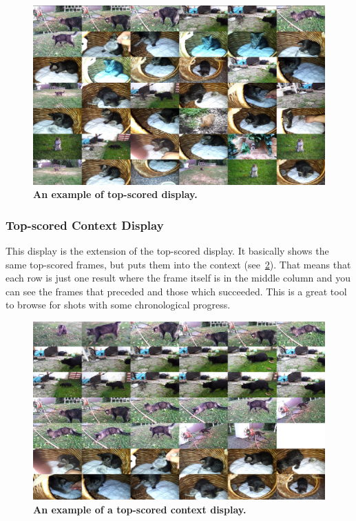 \begin{figure}[h]
	\centering
	\includegraphics[width=1.0\textwidth]{img/top.png}
  \caption{\textbf{An example of top-scored display.}}
	\label{fig:top-display}
\end{figure}

\pagebreak
\subsubsection{Top-scored Context Display}
This display is the extension of the top-scored display. It basically shows the same top-scored frames, but puts them into the context (see~\cref{fig:top--context-display}). That means that each row is just one result where the frame itself is in the middle column and you can see the frames that preceded and those which succeeded. This is a great tool to browse for shots with some chronological progress.

\begin{figure}[h]
	\centering
	\includegraphics[width=1.0\textwidth]{img/top-context.png}
  \caption{\textbf{An example of a top-scored context display.}}
	\label{fig:top--context-display}
\end{figure}

